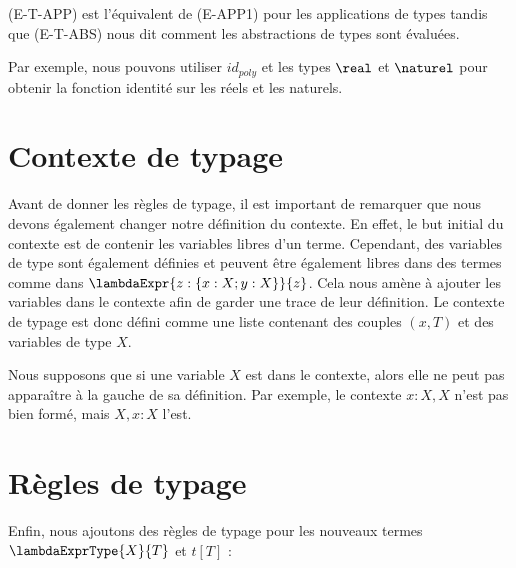 
(E-T-APP) est l'équivalent de (E-APP1) pour les applications de types tandis que
(E-T-ABS) nous dit comment les abstractions de types sont évaluées.

Par exemple, nous pouvons utiliser $id_{poly}$ et les types $\real$ et
$\naturel$ pour obtenir la fonction identité sur les réels et les naturels.


\section{Contexte de typage}

Avant de donner les règles de typage, il est important de remarquer que nous
devons également changer notre définition du contexte. En effet, le but initial
du contexte est de contenir les variables libres d'un terme. Cependant, des
variables de type sont également définies et peuvent être également libres dans des
termes comme dans $\lambdaExpr{z : \left\{ x : X ; y : X \right\}}{z}$.
Cela nous amène à ajouter les variables dans le contexte afin de garder une
trace de leur définition. Le contexte de typage
est donc défini comme une liste contenant des couples $(x, T)$ et des variables
de type $X$.

Nous supposons que si une variable $X$ est dans le contexte, alors elle ne peut
pas apparaître à la gauche de sa définition. Par exemple, le contexte $x : X, X$
n'est pas bien formé, mais $X, x : X$ l'est.

\section{Règles de typage}

Enfin, nous ajoutons des règles de typage pour les nouveaux termes
$\lambdaExprType{X}{T}$ et $t[T]$ :


